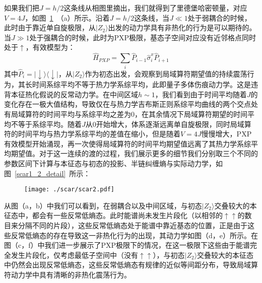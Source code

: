 如果我们把$J=h/2$这条线从相图里摘出，我们就得到了里德堡哈密顿量，对应$V=4J$，如图~\ref{scar1_2}~（a）所示。沿着$J=h/2$这条线，当$J\ll 1$处于弱耦合的时候，此时由于靠近单自旋极限，从$|Z_2\rangle$出发的动力学具有非热化的行为是可以期待的。当$J\gg 1$处于强耦合的时候，此时为PXP极限，基态子空间对应没有近邻格点同时处于$\uparrow$，有效模型为：
\begin{equation}
	\hat{H}_{PXP} = \sum_i\hat{P}_{i-1}\hat{\sigma}_{i}^x\hat{P}_{i+1}
\end{equation}
其中$\hat{P}_i=|\downarrow\rangle\langle\downarrow|$，从$|Z_2\rangle$作为初态出发，会观察到局域算符期望值的持续震荡行为，其长时间系综平均不等于热力学系综平均，此即量子多体伤痕动力学。这是违背本征热化假说的反常动力学。在中间区域$h\sim 1$，我们看到由于时间平均随着$J$的变化存在一极大值结构，导致仅在与热力学吉布斯正则系综平均曲线的两个交点处有局域算符的时间平均与系综平均之差为0，在其余情况下局域算符期望的时间平均不等于系综平均。随着$J$从0开始增大，体系逐渐远离单自旋极限，同时局域算符的时间平均与热力学系综平均的差值在缩小，但是随着$V=4J$慢慢增大，PXP有效模型开始涌现，再一次使得局域算符的时间平均期望值远离了其热力学系综平均期望值。对于这一连续的渡的过程，我们展示更多的细节我们分别取三个不同的参数区间下计算与本征态与初态的投影、半链纠缠熵与实际动力学，如图~\ref{scar1_2_detail}~所示：
\begin{figure}[h]
\centering
\texttt{[image: ./scar/scar2.pdf]}
\label{scar1_2}
\end{figure}
从图（a，b）中我们可以看到，在弱耦合以及中间区域，与初态$|Z_2\rangle$交叠较大的本征态中，都会有一些反常低熵态。此时能谱尚未发生片段化（以相邻的$\uparrow\uparrow$的数目来分隔不同的片段），这些反常低熵态处于能谱中靠近基态的位置，正是由于这些反常低熵态的存在导致这一非热化行为的出现，其动力学如图（d，e）所示。在图（c，f）中我们进一步展示了PXP极限下的情况，在这一极限下这些由于能谱完全发生片段化，仅考虑最低子空间中（没有$\uparrow\uparrow$），与初态$|Z_2\rangle$交叠较大的本征态中仍然会出现反常低熵态，这些反常低熵态有规律的近似等间距分布，导致局域算符动力学中具有清晰的非热化震荡行为。
